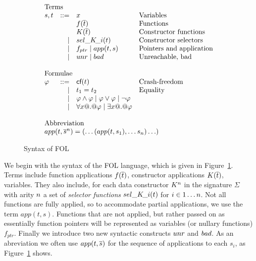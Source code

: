 \begin{figure}
\[\begin{array}{c} 
\begin{array}{lrll}
\multicolumn{3}{l}{\text{Terms}} \\
  s,t & ::=  & x                          & \text{Variables} \\ 
      &      & f(\ol{t})                  & \text{Functions} \\
      &      & K(\ol{t})                  & \text{Constructor functions} \\ 
      & \mid & \sel{K}{i}(t)              & \text{Constructor selectors} \\ 
      & \mid & f_{ptr} \mid app(t,s)       & \text{Pointers and application} \\
      & \mid & \unr \mid \bad             & \text{Unreachable, bad} \\ \\
\multicolumn{3}{l}{\text{Formulae}} \\ 
 \phi & ::=  & \lcf{t}    & \text{Crash-freedom} \\
      & \mid & t_1 = t_2  & \text{Equality} \\ 
      & \mid & \phi \land \phi \mid \phi \lor \phi \mid \neg \phi \\
      & \mid & \forall x @.@ \phi \mid \exists x @.@ \phi \\ \\ 
\multicolumn{3}{l}{\text{Abbreviation}} \\ 
\multicolumn{4}{l}{app(t,\oln{s}{n}) = (\ldots(app(t,s_1),\ldots s_n)\ldots)}
\end{array}
\end{array}\]
\caption{Syntax of FOL}\label{fig:fol-image}
\end{figure}

We begin with the syntax of the FOL language, which
is given in Figure~\ref{fig:fol-image}. Terms include function 
applications $f(\overline{t})$, constructor applications $K(\overline{t})$, variables. They 
also include, for each data constructor $K^n$ in the signature $\Sigma$ with 
arity $n$ a set of {\em selector functions} $\mathop{sel\_K\!\_i}(t)$ for $i \in 1 \ldots n$.
Not all functions are fully applied, so to accommodate partial applications, we use 
the term $app(t,s)$. Functions that are not applied, but rather passed on as essentially 
function pointers will be represented as variables (or nullary functions) $f_{ptr}$. Finally 
we introduce two new syntactic constructs $\mathop{unr}$ and $\mathop{bad}$. As an abreviation we often use
$app(t,\overline{s})$ for the sequence of applications to each $s_i$, as 
Figure~\ref{fig:fol-image} shows.

